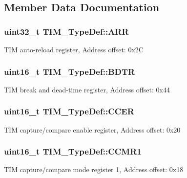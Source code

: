 \subsection{Member Data Documentation}
\subsubsection[{\texorpdfstring{A\+RR}{ARR}}]{ uint32\+\_\+t T\+I\+M\+\_\+\+Type\+Def\+::\+A\+RR}\hypertarget{struct_t_i_m___type_def_a6a42766a6ca3c7fe10a810ebd6b9d627}{}\label{struct_t_i_m___type_def_a6a42766a6ca3c7fe10a810ebd6b9d627}
T\+IM auto-\/reload register, Address offset\+: 0x2C 
\subsubsection[{\texorpdfstring{B\+D\+TR}{BDTR}}]{ uint16\+\_\+t T\+I\+M\+\_\+\+Type\+Def\+::\+B\+D\+TR}\hypertarget{struct_t_i_m___type_def_a32bbedb8b418359c6873375ec949cf8b}{}\label{struct_t_i_m___type_def_a32bbedb8b418359c6873375ec949cf8b}
T\+IM break and dead-\/time register, Address offset\+: 0x44 
\subsubsection[{\texorpdfstring{C\+C\+ER}{CCER}}]{ uint16\+\_\+t T\+I\+M\+\_\+\+Type\+Def\+::\+C\+C\+ER}\hypertarget{struct_t_i_m___type_def_a2a7ebf9d3041dc20da591668d916f5bc}{}\label{struct_t_i_m___type_def_a2a7ebf9d3041dc20da591668d916f5bc}
T\+IM capture/compare enable register, Address offset\+: 0x20 
\subsubsection[{\texorpdfstring{C\+C\+M\+R1}{CCMR1}}]{ uint16\+\_\+t T\+I\+M\+\_\+\+Type\+Def\+::\+C\+C\+M\+R1}\hypertarget{struct_t_i_m___type_def_a9094f9bb312461d2fc1499f5f8d91c64}{}\label{struct_t_i_m___type_def_a9094f9bb312461d2fc1499f5f8d91c64}
T\+IM capture/compare mode register 1, Address offset\+: 0x18 
